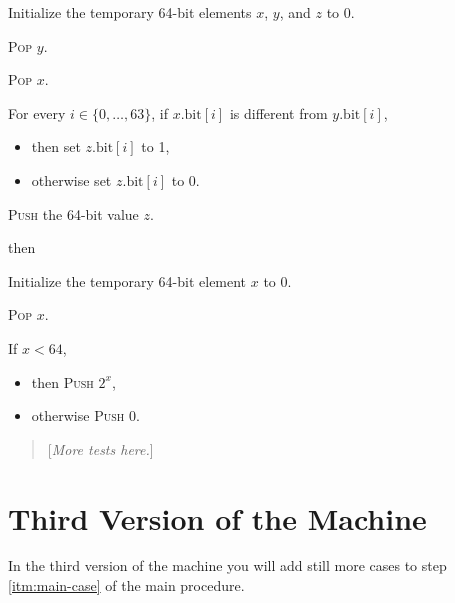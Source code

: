 \documentclass[a4paper,12pt]{article}
\newcommand{\num}[1]{\texttt{#1}}
\newcommand{\hex}[1]{\num{#1}_{\textup{\tiny 16}}}
\newcommand{\bitno}[2]{#1.\mathrm{bit}[#2]}
\newcommand{\range}[2]{\{#1,\ldots,#2\}}
\newcommand{\proc}[1]{\textsc{#1}}
\newcommand{\comment}[1]{\begin{quote}[\textit{#1}]\end{quote}}
\newcommand{\op}[1]{$#1$}
\newcommand{\POW}       [1]{\op{\hex{2C}}}
\begin{document}
\begin{stepnumbers}[start=3]
\begin{description}
    \begin{stepnumbers}
    \item Initialize the temporary 64-bit elements $x$, $y$, and $z$ to 0.
    \item \proc{Pop} $y$.
    \item \proc{Pop} $x$.
    \item For every $i \in \range{0}{63}$, if $\bitno{x}{i}$ is different from $\bitno{y}{i}$,
      \begin{itemize}[label=]
      \item then set $\bitno{z}{i}$ to 1,
      \item otherwise set $\bitno{z}{i}$ to 0.
      \end{itemize}
    \item \proc{Push} the 64-bit value $z$.
    \end{stepnumbers}
  \item[\POW{}] then
    \begin{stepnumbers}
    \item Initialize the temporary 64-bit element $x$ to 0.
    \item \proc{Pop} $x$.
    \item If $x < 64$,
      \begin{itemize}[label=]
      \item then \proc{Push} $2^x$,
      \item otherwise \proc{Push} 0.
      \end{itemize}
    \end{stepnumbers}
  \end{description}
\end{stepnumbers}

\comment{More tests here.}

\section{Third Version of the Machine}

In the third version of the machine you will add still more cases to step \ref{itm:main-case} of the main procedure.
\end{document}
